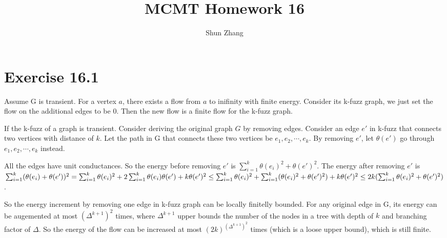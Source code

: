 \documentclass[10pt]{article}
\title{MCMT Homework 16}
\author{Shun Zhang}
\date{}
\begin{document}
\maketitle

\section*{Exercise 16.1}

Assume G is transient. For a vertex $a$, there exists a flow from $a$ to
inifinity with finite energy. Consider its k-fuzz graph, we just set the
flow on the additional edges to be 0. Then the new flow is a finite flow for the
k-fuzz graph.

\hfill

If the k-fuzz of a graph is transient. Consider deriving the original graph $G$ by
removing edges. Consider an edge $e'$ in k-fuzz that connects two vertices with
distance of $k$.  Let the path in G that connects these two vertices be $e_1,
e_2, \cdots, e_k$.  By removing $e'$, let $\theta(e')$ go through $e_1, e_2,
\cdots, e_k$ instead.

All the edges have unit conductances. So the energy before removing $e'$ is
$\sum_{i=1}^k \theta(e_i)^2 + \theta(e')^2$. The energy after removing $e'$ is 
$\sum_{i=1}^k (\theta(e_i) + \theta(e'))^2\\
= \sum_{i=1}^k \theta(e_i)^2 + 2 \sum_{i=1}^k \theta(e_i) \theta(e') + k
\theta(e')^2\\
\leq \sum_{i=1}^k \theta(e_i)^2 + \sum_{i=1}^k (\theta(e_i)^2 + \theta(e')^2) +
k \theta(e')^2\\
\leq 2k (\sum_{i=1}^k \theta(e_i)^2 + \theta(e')^2)
$.

So the energy increment by removing one edge in k-fuzz graph can be locally
finitelly bounded.  For any original edge in G, its energy can be augemented at
most $(\Delta^{k+1})^2$ times, where $\Delta^{k+1}$ upper bounds the number of
the nodes in a tree with depth of $k$ and branching factor of $\Delta$. So the
energy of the flow can be increased at most $(2k)^{(\Delta^{k+1})^2}$ times
(which is a loose upper bound), which is still finite.
\end{document}
